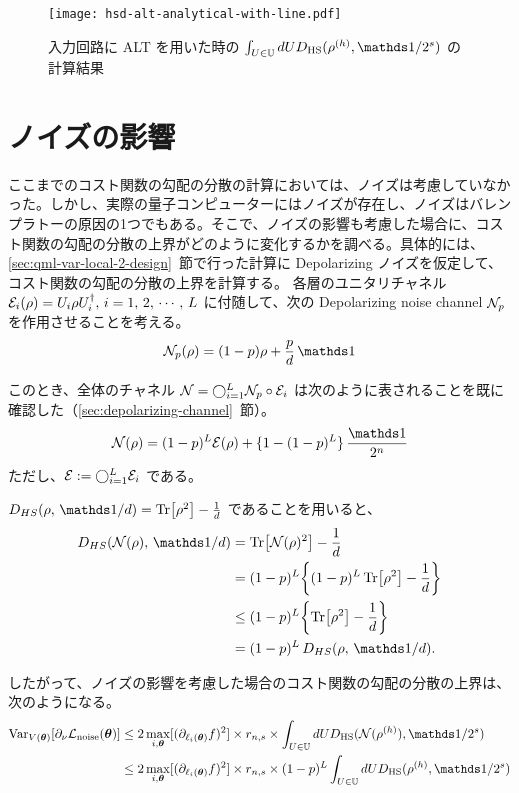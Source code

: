 \begin{figure}[H]
    \centering
    \texttt{[image: hsd-alt-analytical-with-line.pdf]}
    \caption{入力回路に ALT を用いた時の $\int_{U\in\bbU} dU D_{\HS} (\rho^{(h)} , \bbid/2^s)$ の計算結果}
    \label{fig:hsd-alt-analytical}
\end{figure}


\section{ノイズの影響}\label{sec:qml-var-noise}
ここまでのコスト関数の勾配の分散の計算においては、ノイズは考慮していなかった。しかし、実際の量子コンピューターにはノイズが存在し、ノイズはバレンプラトーの原因の1つでもある。そこで、ノイズの影響も考慮した場合に、コスト関数の勾配の分散の上界がどのように変化するかを調べる。具体的には、\ref{sec:qml-var-local-2-design}~節で行った計算に Depolarizing ノイズを仮定して、コスト関数の勾配の分散の上界を計算する。
各層のユニタリチャネル $\mathcal{E}_i(\rho) = U_i\rho U_i^\dagger,\, i = 1,\,2,\,\cdots,\,L$ に付随して、次の Depolarizing noise channel $\mathcal{N}_p$ を作用させることを考える。
\begin{align*}
    \calN_p(\rho) = (1-p)\rho + \frac{p}{d}\,\bbid
\end{align*}

このとき、全体のチャネル $\mathcal{N} = \bigcirc_{i=1}^L \mathcal{N}_{p} \circ \mathcal{E}_i$ は次のように表されることを既に確認した（\ref{sec:depolarizing-channel}~節）。
\begin{align*}
    \calN(\rho)
    = (1 - p)^L\calE(\rho) + \{1 - (1 - p)^L\}\,\frac{\bbid}{2^n}
\end{align*}
ただし、$\mathcal{E} := \bigcirc_{i=1}^L \mathcal{E}_i$ である。

$D_{HS}(\rho,\,\bbid/d) = \Tr[\rho^2] - \frac{1}{d}$ であることを用いると、
\begin{align}
    D_{HS}(\calN(\rho),\,\bbid/d)
    &= \Tr[\calN(\rho)^2] - \frac{1}{d}\nonumber\\
    &= (1-p)^L\qty{(1-p)^L\Tr[\rho^2] - \frac{1}{d}}\nonumber\\
    &\leq (1-p)^L\qty{\Tr[\rho^2] - \frac{1}{d}}\nonumber\\
    &= (1-p)^L\,D_{HS}(\rho,\,\bbid/d).
\end{align}

したがって、ノイズの影響を考慮した場合のコスト関数の勾配の分散の上界は、次のようになる。
\begin{align}
    \Var_{V(\bs{\th})}[\pd_\nu \calL_{\text{noise}}(\bs{\th})]
    &\leq
    2\max_{i,\bs{\th}} [(\pd_{\ell_i(\bs{\th})}f)^2]
    \times r_{n,s} \times
    \int_{U\in\bbU} dU D_{\HS} (\calN(\rho^{(h)}) , \bbid/2^s)\nonumber\\
    &\leq
    2\max_{i,\bs{\th}} [(\pd_{\ell_i(\bs{\th})}f)^2]
    \times r_{n,s} \times
    (1-p)^L\int_{U\in\bbU} dU D_{\HS} (\rho^{(h)} , \bbid/2^s)\label{eq:qml-var-bound-noise}
\end{align}

